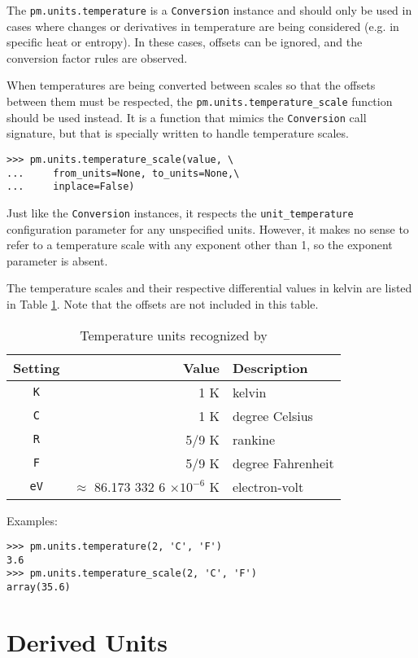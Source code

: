 The \verb|pm.units.temperature| is a \verb|Conversion| instance and should only be used in cases where changes or derivatives in temperature are being considered (e.g. in specific heat or entropy).  In these cases, offsets can be ignored, and the conversion factor rules are observed.  

When temperatures are being converted between scales so that the offsets between them must be respected, the \verb|pm.units.temperature_scale| function should be used instead.  It is a function that mimics the \verb|Conversion| call signature, but that is specially written to handle temperature scales. 

\begin{lstlisting}
>>> pm.units.temperature_scale(value, \
...     from_units=None, to_units=None,\
...     inplace=False)
\end{lstlisting}

Just like the \verb|Conversion| instances, it respects the \verb|unit_temperature| configuration parameter for any unspecified units.  However, it makes no sense to refer to a temperature scale with any exponent other than 1, so the exponent parameter is absent.

The temperature scales and their respective differential values in kelvin are listed in Table \ref{tab:temperature}.  Note that the offsets are not included in this table.

\begin{table}
\centering
\caption{Temperature units recognized by \PM}\label{tab:temperature}
\begin{tabular}{crl}
\hline
Setting & Value & Description\\
\hline
\verb|K| & 1 K & kelvin\\
\verb|C| & 1 K & degree Celsius\\
\verb|R| & 5/9 K & rankine\\
\verb|F| & 5/9 K & degree Fahrenheit\\
\verb|eV| & $\approx$ 86.173 332 6 $\times 10^{-6}$ K & electron-volt\\
\hline
\end{tabular}
\end{table}

Examples:
\begin{lstlisting}
>>> pm.units.temperature(2, 'C', 'F')
3.6
>>> pm.units.temperature_scale(2, 'C', 'F')
array(35.6)
\end{lstlisting}


\section{Derived Units}

